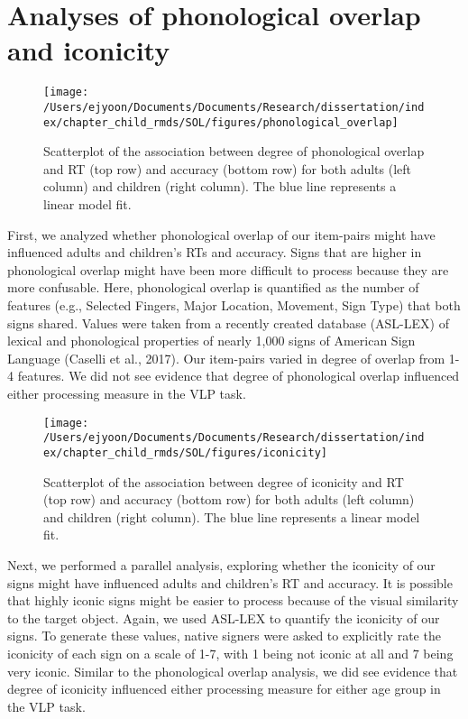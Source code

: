 \documentclass[oneside]{report}
\begin{document}
\section{Analyses of phonological overlap and
iconicity}\label{analyses-of-phonological-overlap-and-iconicity}
\begin{figure}[!t]

{\centering \texttt{[image: /Users/ejyoon/Documents/Documents/Research/dissertation/index/chapter\_child\_rmds/SOL/figures/phonological\_overlap]} 

}

\caption[Association between degree of phonological overlap and RT/Accuracy in Experiment 1.1.]{Scatterplot of the association between degree of phonological overlap and RT (top row) and accuracy (bottom row) for both adults (left column) and children (right column). The blue line represents a linear model fit.}\label{fig:unnamed-chunk-11}
\end{figure}
First, we analyzed whether phonological overlap of our item-pairs might
have influenced adults and children's RTs and accuracy. Signs that are
higher in phonological overlap might have been more difficult to process
because they are more confusable. Here, phonological overlap is
quantified as the number of features (e.g., Selected Fingers, Major
Location, Movement, Sign Type) that both signs shared. Values were taken
from a recently created database (ASL-LEX) of lexical and phonological
properties of nearly 1,000 signs of American Sign Language (Caselli et
al., 2017). Our item-pairs varied in degree of overlap from 1-4
features. We did not see evidence that degree of phonological overlap
influenced either processing measure in the VLP task.
\begin{figure}[!t]

{\centering \texttt{[image: /Users/ejyoon/Documents/Documents/Research/dissertation/index/chapter\_child\_rmds/SOL/figures/iconicity]} 

}

\caption[Association between degree of iconicity and RT/Accuracy in Experiment 1.1]{Scatterplot of the association between degree of iconicity and RT (top row) and accuracy (bottom row) for both adults (left column) and children (right column). The blue line represents a linear model fit.}\label{fig:unnamed-chunk-12}
\end{figure}
Next, we performed a parallel analysis, exploring whether the iconicity
of our signs might have influenced adults and children's RT and
accuracy. It is possible that highly iconic signs might be easier to
process because of the visual similarity to the target object. Again, we
used ASL-LEX to quantify the iconicity of our signs. To generate these
values, native signers were asked to explicitly rate the iconicity of
each sign on a scale of 1-7, with 1 being not iconic at all and 7 being
very iconic. Similar to the phonological overlap analysis, we did see
evidence that degree of iconicity influenced either processing measure
for either age group in the VLP task.
\end{document}
